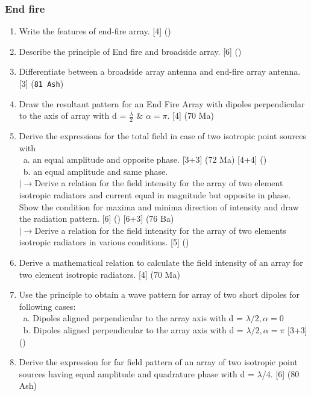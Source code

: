 \documentclass[12pt]{article}
\newcommand{\lb}{\\$\left|\rightarrow\right.$}
\newcommand{\enter}{\\\textcolor{white}{1}}
\begin{document}
    \subsubsection{End fire}
      \begin{enumerate}
        \item Write the features of end-fire array. \hfill [4] ()

        \item Describe the principle of End fire and broadside array. \hfill [6] ()

        \item Differentiate between a broadside array antenna and end-fire array antenna. \hfill [3] (\texttt{81 Ash})

        \item Draw the resultant pattern for an End Fire Array with dipoles perpendicular to the axis of array with d = $\frac{\lambda}{2}$ \& $\alpha = \pi$. \hfill [4] (70 Ma)

        \item Derive the expressions for the total field in case of two isotropic point sources with
          \enter a. an equal amplitude and opposite phase. \hfill [3+3] (72 Ma) [4+4] ()
          \enter b. an equal amplitude and same phase.
          \lb Derive a relation for the field intensity for the array of two element isotropic radiators and current equal in magnitude but opposite in phase. Show the condition for maxima and minima direction of intensity and draw the radiation pattern. \hfill [6] () [6+3] (76 Ba)
          \lb Derive a relation for the field intensity for the array of two elements isotropic radiators in various conditions. \hfill [5] ()
        
        \item Derive a mathematical relation to calculate the field intensity of an array for two element isotropic radiators. \hfill [4] (70 Ma)
        
        \item Use the principle to obtain a wave pattern for array of two short dipoles for following cases:
          \enter a. Dipoles aligned perpendicular to the array axis with d = $\lambda/2, \alpha = 0$
          \enter b. Dipoles aligned perpendicular to the array axis with d = $\lambda/2, \alpha = \pi$ \hfill [3+3] ()

        \item Derive the expression for far field pattern of an array of two isotropic point sources having equal amplitude and quadrature phase with d = $\lambda$/4. \hfill [6] (80 Ash)


\end{enumerate}
\end{document}
